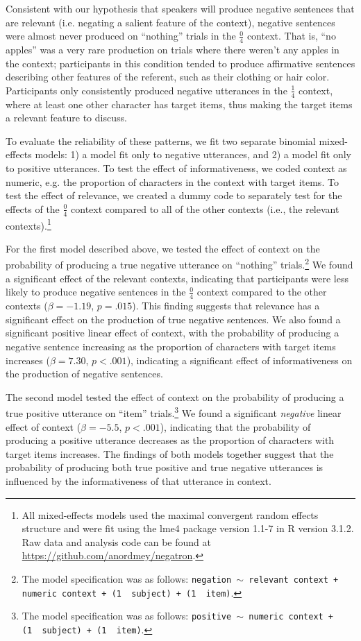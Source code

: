 \documentclass[man, noapacite]{apa2}
\begin{document}
Consistent with our hypothesis that speakers will produce negative sentences that are relevant (i.e. negating a salient feature of the context), negative sentences were almost never produced on ``nothing'' trials in the $\frac{0}{4}$ context. That is, ``no apples'' was a very rare production on trials where there weren't any apples in the context; participants in this condition tended to produce affirmative sentences describing other features of the referent, such as their clothing or hair color. Participants only consistently produced negative utterances in the $\frac{1}{4}$ context, where at least one other character has target items, thus making the target items a relevant feature to discuss. 

To evaluate the reliability of these patterns, we fit two separate binomial mixed-effects models: 1) a model fit only to negative utterances, and 2) a model fit only to positive utterances. To test the effect of informativeness, we coded context as numeric, e.g. the proportion of characters in the context with target items. To test the effect of relevance, we created a dummy code to separately test for the effects of the  $\frac{0}{4}$ context compared to all of the other contexts (i.e., the relevant contexts).\footnote{All mixed-effects models used the maximal convergent random effects structure \cite{barr2013} and were fit using the lme4 package version 1.1-7 in R version 3.1.2. Raw data and analysis code can be found at \url{https://github.com/anordmey/negatron}.}

For the first model described above, we tested the effect of context on the probability of producing a true negative utterance on ``nothing'' trials.\footnote{The model specification was as follows: \texttt{negation $\sim$  relevant context + numeric context + (1~\textbar~subject) +  (1~\textbar~item)}.} We  found a significant effect of the relevant contexts, indicating that participants were less likely to produce negative sentences in the $\frac{0}{4}$ context compared to the other contexts ($\beta= -1.19$, $p = .015$). This finding suggests that relevance has a significant effect on the production of true negative sentences. We also found a significant positive linear effect of context, with the probability of producing a negative sentence increasing as the proportion of characters with target items increases ($\beta= 7.30$, $p< .001$), indicating a significant effect of informativeness on the production of negative sentences. 

The second model tested the effect of context on the probability of producing a true positive utterance on ``item'' trials.\footnote{The model specification was as follows: \texttt{positive $\sim$  numeric context + (1~\textbar~subject) +  (1~\textbar~item)}.} We found a significant \emph{negative} linear effect of context ($\beta= -5.5$, $p< .001$), indicating that the probability of producing a positive utterance decreases as the proportion of characters with target items increases. The findings of both models together suggest that the probability of producing both true positive and true negative utterances is influenced by the informativeness of that utterance in context.
\end{document}

